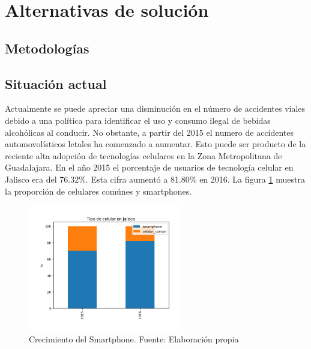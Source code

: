 \documentclass{article}
\begin{document}
\newpage

\section{Alternativas de solución}\label{sec:alternatives}

% 

\subsection{Metodologías}

\subsection{Situación actual}\label{subsec:actual}

Actualmente se puede apreciar una disminución en el número de accidentes viales debido a
una política para identificar el uso y consumo ilegal de bebidas alcohólicas al conducir.
No obstante, a partir del 2015 el numero de accidentes automovolísticos letales ha comenzado
a aumentar. Esto puede ser producto de la reciente alta adopción de tecnologías celulares en la Zona
Metropolitana de Guadalajara. En el año 2015 el porcentaje de usuarios de tecnología celular en Jalisco
era del 76.32\%. Esta cifra aumentó a 81.80\% en 2016. La figura \ref{fig:tipo_celular} muestra la
proporción de celulares comúnes y smartphones.


	\begin{figure}[H]\centering
	\includegraphics[width=0.6\textwidth]{resources/img/tipo_de_celular.png}
	\caption{\label{fig:tipo_celular} Crecimiento del Smartphone. Fuente: Elaboración propia}
    \end{figure}
\end{document}
